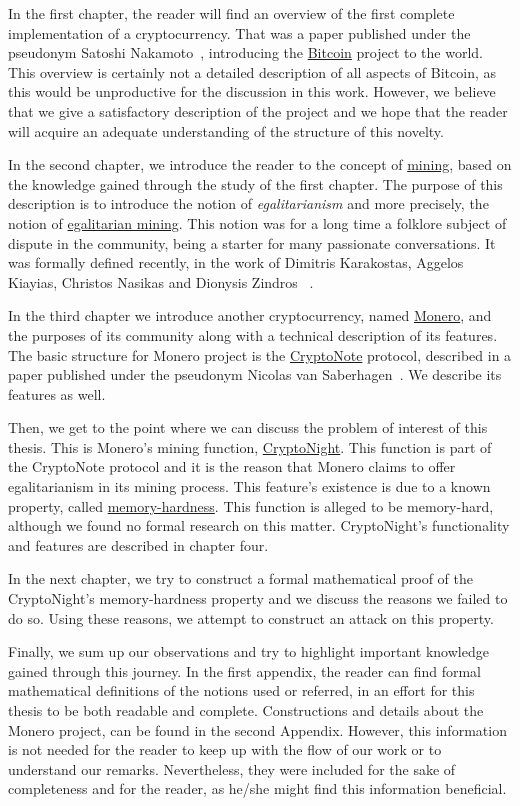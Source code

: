 In the first chapter, the reader will find an overview of the first complete implementation of a cryptocurrency. That was a paper published under the pseudonym Satoshi Nakamoto~\cite{Nakamoto_bitcoin:a}, introducing the \hyperref[sec:Bitcoin]{Bitcoin} project to the world. This overview is certainly not a detailed description of all aspects of Bitcoin, as this would be unproductive for the discussion in this work. However, we believe that we give a satisfactory description of the project and we hope that the reader will acquire an adequate understanding of the structure of this novelty.

In the second chapter, we introduce the reader to the concept of \hyperref[sec:mining]{mining}, based on the knowledge gained through the study of the first chapter. The purpose of this description is to introduce the notion of \emph{egalitarianism} and more precisely, the notion of \hyperref[sec:egalitarian]{egalitarian mining}. This notion was for a long time a folklore subject of dispute in the community, being a starter for many passionate conversations. It was formally defined recently, in the work of Dimitris Karakostas, Aggelos Kiayias, Christos Nasikas and Dionysis Zindros ~\cite{egalitarianism}.
\pagebreak

In the third chapter we introduce another cryptocurrency, named \hyperref[sec:Monero]{Monero}, and the purposes of its community along with a technical description of its features. The basic structure for Monero project is the \hyperref[sec:CryptoNote]{CryptoNote} protocol, described in a paper published under the pseudonym Nicolas van Saberhagen~\cite{citeulike:14139412}. We describe its features as well.

Then, we get to the point where we can discuss the problem of interest of this thesis. This is Monero's mining function, \hyperref[ch:cryptonight]{CryptoNight}. This function is part of the CryptoNote protocol and it is the reason that Monero claims to offer egalitarianism in its mining process. This feature's existence is due to a known property, called \hyperref[sec:memory-hard]{memory-hardness}. This function is alleged to be memory-hard, although we found no formal research on this matter. CryptoNight's functionality and features are described in chapter four.

In the next chapter, we try to construct a formal mathematical proof of the CryptoNight's memory-hardness property and we discuss the reasons we failed to do so. Using these reasons, we attempt to construct an attack on this property.

Finally, we sum up our observations and try to highlight important knowledge gained through this journey. In the first appendix, the reader can find formal mathematical definitions of the notions used or referred, in an effort for this thesis to be both readable and complete. Constructions and details about the Monero project, can be found in the second Appendix. However, this information is not needed for the reader to keep up with the flow of our work or to understand our remarks. Nevertheless, they were included for the sake of completeness and for the reader, as he/she might find this information beneficial.
